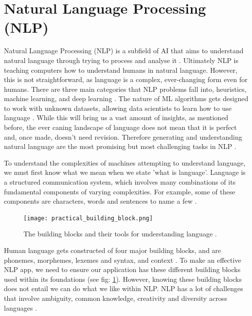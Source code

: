 	
	\section{Natural Language Processing (NLP)}
		Natural Language Processing (NLP) is a subfield of AI that aims to understand natural language through trying to process and analyse it \cite{vasiliev2020natural, vajjala2020practical}. Ultimately NLP is teaching computers how to understand humans in natural language. However, this is not straightforward, as language is a complex, ever-changing form even for humans. There are three main categories that NLP problems fall into, heuristics, machine learning, and deep learning \cite{vajjala2020practical}. The nature of ML algorithms gets designed to work with unknown datasets, allowing data scientists to learn how to use language \cite{vasiliev2020natural}. While this will bring us a vast amount of insights, as mentioned before, the ever caning landscape of language does not mean that it is perfect and, once made, doesn't need revision. Therefore generating and understanding natural language are the most promising but most challenging tasks in NLP \cite{vasiliev2020natural, vajjala2020practical}.
		
		To understand the complexities of machines attempting to understand language, we must first know what we mean when we state 'what is language'. Language is a structured communication system, which involves many combinations of its fundamental components of varying complexities. For example, some of these components are characters, words and sentences to name a few \cite{vajjala2020practical}.
		
		\begin{figure}[t]
			\centering
			\texttt{[image: practical\_building\_block.png]}
			\caption{The building blocks and their tools for understanding language \cite{vajjala2020practical}.}
			\label{fig:practical_building_block}
			
		\end{figure} 
		
		Human language gets constructed of four major building blocks, and are phonemes, morphemes, lexemes and syntax, and context \cite{vajjala2020practical}. To make an effective NLP app, we need to ensure our application has these different building blocks used within its foundations (see fig: \ref{fig:practical_building_block}). However, knowing these building blocks does not entail we can do what we like within NLP. NLP has a lot of challenges that involve ambiguity, common knowledge, creativity and diversity across languages \cite{vajjala2020practical}. 
	
